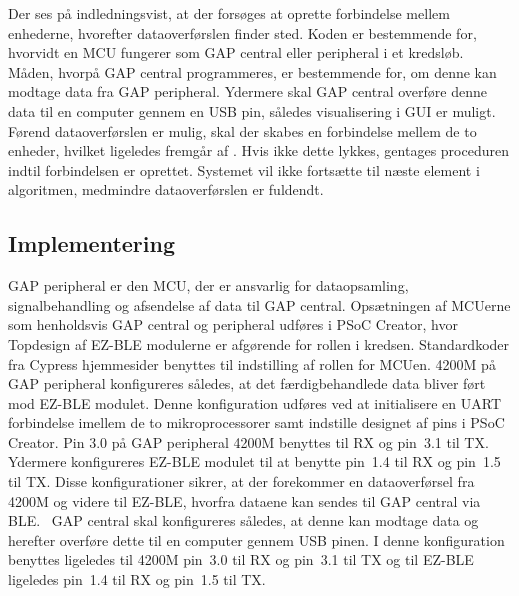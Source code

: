 Der ses på  indledningsvist, at der forsøges at oprette forbindelse mellem enhederne, hvorefter dataoverførslen finder sted. Koden er bestemmende for, hvorvidt en MCU fungerer som GAP central eller peripheral i et kredsløb. Måden, hvorpå GAP central programmeres, er bestemmende for, om denne kan modtage data fra GAP peripheral. Ydermere skal GAP central overføre denne data til en computer gennem en USB pin, således visualisering i GUI er muligt. \newline
Førend dataoverførslen er mulig, skal der skabes en forbindelse mellem de to enheder, hvilket ligeledes fremgår af . Hvis ikke dette lykkes, gentages proceduren indtil forbindelsen er oprettet. Systemet vil ikke fortsætte til næste element i algoritmen, medmindre dataoverførslen er fuldendt.  

\subsection{Implementering}
GAP peripheral er den MCU, der er ansvarlig for dataopsamling, signalbehandling og afsendelse af data til GAP central. Opsætningen af MCUerne som henholdsvis GAP central og peripheral udføres i PSoC Creator, hvor Topdesign af EZ-BLE modulerne er afgørende for rollen i kredsen. Standardkoder fra Cypress hjemmesider benyttes til indstilling af rollen for MCUen. \newline
4200M på GAP peripheral konfigureres således, at det færdigbehandlede data bliver ført mod EZ-BLE modulet. Denne konfiguration udføres ved at initialisere en UART forbindelse imellem de to mikroprocessorer samt indstille designet af pins i PSoC Creator.
Pin 3.0 på GAP peripheral 4200M benyttes til RX og pin~3.1 til TX. Ydermere konfigureres EZ-BLE modulet til at benytte pin~1.4 til RX og pin~1.5 til TX. Disse konfigurationer sikrer, at der forekommer en dataoverførsel fra 4200M og videre til EZ-BLE, hvorfra dataene kan sendes til GAP central via BLE.~\citep{Semiconductor20164200M} \newline
GAP central skal konfigureres således, at denne kan modtage data og herefter overføre dette til en computer gennem USB pinen. I denne konfiguration benyttes ligeledes til 4200M pin~3.0 til RX og pin~3.1 til TX og til EZ-BLE ligeledes pin~1.4 til RX og pin~1.5 til TX.

